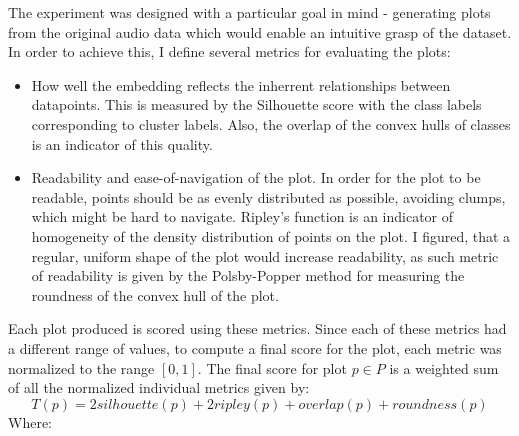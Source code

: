 \documentclass[a4paper, 12pt, twoside]{report}
\begin{document}
The experiment was designed with a particular goal in mind - generating plots from the original audio data which would enable an intuitive grasp of the dataset. In order to achieve this, I define several metrics for evaluating the plots:
\begin{itemize}
\item How well the embedding reflects the inherrent relationships between datapoints. This is measured by the Silhouette score with the class labels corresponding to cluster labels. Also, the overlap of the convex hulls of classes is an indicator of this quality.
\item Readability and ease-of-navigation of the plot. In order for the plot to be readable, points should be as evenly distributed as possible, avoiding clumps, which might be hard to navigate. Ripley's function is an indicator of homogeneity of the density distribution of points on the plot. I figured, that a regular, uniform shape of the plot would increase readability, as such metric of readability is given by the Polsby-Popper method for measuring the roundness of the convex hull of the plot.
\end{itemize}
Each plot produced is scored using these metrics. Since each of these metrics had a different range of values, to compute a final score for the plot, each metric was normalized to the range \([0, 1]\). The final score for plot \(p \in P\) is a weighted sum of all the normalized individual metrics given by:
\[T(p) = 2silhouette(p) + 2ripley(p) + overlap(p) + roundness(p) \]
Where:
\end{document}
